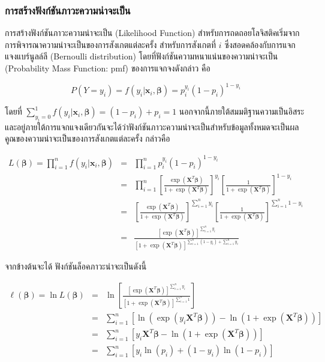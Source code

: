 \subsubsection{การสร้างฟังก์ชันภาวะความน่าจะเป็น}

การสร้างฟังก์ชันภาวะความน่าจะเป็น (Likelihood Function) สำหรับการถดถอยโลจิสติคเริ่มจากการพิจารณาความน่าจะเป็นของการสังเกตแต่ละครั้ง สำหรับการสังเกตที่ $i$ ซึ่งสอดคล้องกับการแจกแจงแบร์นูลล์ลี (Bernoulli distribution) โดยที่ฟังก์ชันความหนาแน่นของความน่าจะเป็น (Probability Mass Function: pmf) ของการแจกจงดังกล่าว คือ 

$$P(Y=y_i)= f(y_i|\mathbf{x}_i, \boldsymbol{\beta}) = p_i^{y_i}(1-p_i)^{1-y_i}$$

\noindent
โดยที่ $\sum_{y_i=0}^{1} f(y_i|\mathbf{x}_i, \boldsymbol{\beta}) = (1-p_i) + p_i = 1$ นอกจากนี้ภายใต้สมมติฐานความเป็นอิสระและอยู่ภายใต้การแจกแจงเดียวกันจะได้ว่าฟังก์ชันภาวะความน่าจะเป็นสำหรับข้อมูลทั้งหมดจะเป็นผลคูณของความน่าจะเป็นของการสังเกตแต่ละครั้ง กล่าวคือ

\begin{eqnarray} \nonumber
	L(\boldsymbol{\beta}) = \prod_{i=1}^{n} f(y_i|\mathbf{x}_i, \boldsymbol{\beta}) 
	&=& \prod_{i=1}^{n} p_i^{y_i}(1-p_i)^{1-y_i} \\ \nonumber
	&=& \prod_{i=1}^{n} \left[\frac{\exp(\mathbf{X}^{T} \boldsymbol{\beta})}{1 + \exp(\mathbf{X}^{T} \boldsymbol{\beta})}\right]^{y_i} \left[\frac{1}{1 + \exp(\mathbf{X}^{T} \boldsymbol{\beta})}\right]^{1-y_i} \\ \nonumber
	&=& \left[\frac{\exp(\mathbf{X}^{T} \boldsymbol{\beta})}{1 + \exp(\mathbf{X}^{T} \boldsymbol{\beta})}\right]^{\sum_{i=1}^{n}y_i} \left[\frac{1}{1 + \exp(\mathbf{X}^{T} \boldsymbol{\beta})}\right]^{\sum_{i=1}^{n}1-y_i} \\ \nonumber
	&=& \frac{[\exp(\mathbf{X}^{T} \boldsymbol{\beta})]^{\sum_{i=1}^{n}y_i}}{[1 + \exp(\mathbf{X}^{T} \boldsymbol{\beta})]^{\sum_{i=1}^{n}(1-y_i) + \sum_{i=1}^{n}y_i}} 
\end{eqnarray}

\noindent
จากข้างต้นจะได้ ฟังก์ชันล็อคภาวะน่าจะเป็นดังนี้

\begin{eqnarray} \nonumber
	\ell(\boldsymbol{\beta}) = \ln L(\boldsymbol{\beta}) 
	&=& \ln \left[\frac{[\exp(\mathbf{X}^{T} \boldsymbol{\beta})]^{\sum_{i=1}^{n}y_i}}{[1 + \exp(\mathbf{X}^{T} \boldsymbol{\beta})]^{\sum_{i=1}^{n}1}} \right] \\ \nonumber
	&=& \sum_{i=1}^{n} \left[\ln(\exp(y_i \mathbf{X}^{T} \boldsymbol{\beta})) - \ln(1 + \exp(\mathbf{X}^{T} \boldsymbol{\beta}))\right] \\ \nonumber
	&=& \sum_{i=1}^{n} [y_i \mathbf{X}^{T} \boldsymbol{\beta} - \ln(1 + \exp(\mathbf{X}^{T} \boldsymbol{\beta}))] \\ \nonumber
	&=& \sum_{i=1}^{n} [y_i \ln(p_i) + (1-y_i) \ln(1-p_i)]
\end{eqnarray}

